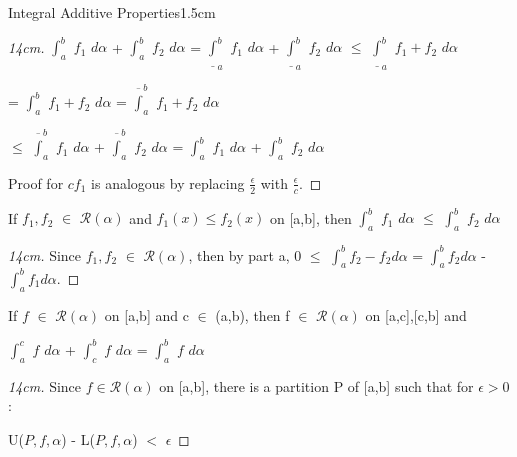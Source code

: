 \begin{ltheorem}{Integral Additive Properties}{1.5cm}
\begin{proof}[14cm]
                \hspace{0.5cm}
                $\int_a^b$ $f_1$ $d\alpha$
                + $\int_a^b$ $f_2$ $d\alpha$
                = $\underline{\int}_a^b$ $f_1$ $d\alpha$
                + $\underline{\int}_a^b$ $f_2$ $d\alpha$
                $\leq$ $\underline{\int}_a^b$ $f_1+f_2$ $d\alpha$

                \hspace{4.3cm}
                = $\int_a^b$ $f_1+f_2$ $d\alpha$
                = $\overline{\int}_a^b$ $f_1+f_2$ $d\alpha$
                
                \hspace{4.3cm}
                $\leq$ $\overline{\int}_a^b$ $f_1$ $d\alpha$
                + $\overline{\int}_a^b$ $f_2$ $d\alpha$
                = $\int_a^b$ $f_1$ $d\alpha$
                + $\int_a^b$ $f_2$ $d\alpha$

                Proof for $cf_1$ is analogous by replacing $\frac{\epsilon}{2}$
                with $\frac{\epsilon}{c}$.                
            \end{proof}

    \item If $f_1,f_2$ $\in$ $\mathscr{R}(\alpha)$ and $f_1(x) \leq f_2(x)$
    on [a,b], then $\int_a^b$ $f_1$ $d\alpha$ $\leq$ $\int_a^b$ $f_2$ $d\alpha$

        \begin{proof}[14cm]
            Since $f_1,f_2$ $\in$ $\mathscr{R}(\alpha)$, then by part a,
            0 $\leq$ $\int_a^b f_2-f_2 d\alpha$
            = $\int_a^b f_2 d\alpha$ - $\int_a^b f_1 d\alpha$.
        \end{proof}

        \newpage

    \item If $f$ $\in$ $\mathscr{R}(\alpha)$ on [a,b] and c $\in$ (a,b),
    then f $\in$ $\mathscr{R}(\alpha)$ on [a,c],[c,b] and
        
    \hspace{0.5cm}
    $\int_a^c$ $f$ $d\alpha$ + $\int_c^b$ $f$ $d\alpha$
    = $\int_a^b$ $f$ $d\alpha$

        \begin{proof}[14cm]
            Since $f \in \mathscr{R}(\alpha)$ on [a,b], there is a
            partition P of [a,b] such that for $\epsilon > 0$:

            \hspace{0.5cm}
            U($P,f,\alpha$) - L($P,f,\alpha$) $<$ $\epsilon$


\end{proof}
\end{ltheorem}
